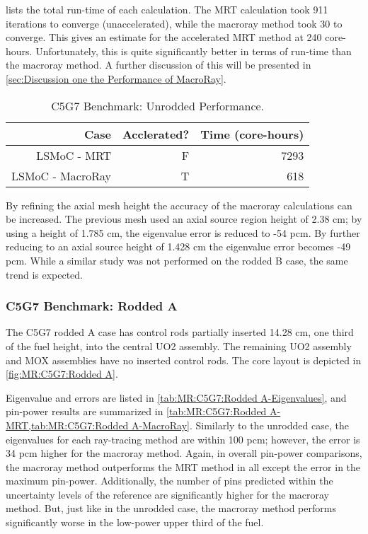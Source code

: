{{{{         lists the total run-time of each calculation.
        The \ac{MRT} calculation took 911 iterations to converge (unaccelerated), while the macroray method took 30 to converge.
        This gives an estimate for the accelerated \ac{MRT} method at 240 core-hours.
        Unfortunately, this is quite significantly better in terms of run-time than the macroray method.
        A further discussion of this will be presented in \cref{sec:Discussion one the Performance of MacroRay}.

        \begin{table}[htbp]
          \centering
          \caption{C5G7 Benchmark: Unrodded Performance. \label{tab:MR:C5G7:Unrodded-Performance}}
          \begin{tabular}{rrr}\toprule
            Case                        & Acclerated? & Time (core-hours)\\\midrule
            LSMoC - MRT                 & F & 7293\\
            LSMoC - MacroRay            & T & 618\\\bottomrule
          \end{tabular}
        \end{table}


        By refining the axial mesh height the accuracy of the macroray calculations can be increased.
        The previous mesh used an axial source region height of 2.38 cm; by using a height of 1.785 cm, the eigenvalue error is reduced to -54 pcm.
        By further reducing to an axial source height of 1.428 cm the eigenvalue error becomes -49 pcm.
        While a similar study was not performed on the rodded B case, the same trend is expected.
      }

      \subsubsection{C5G7 Benchmark: Rodded A}{\label{sssec:MR:C5G7:Rodded A}
        The C5G7 rodded A case has control rods partially inserted 14.28 cm, one third of the fuel height, into the central \ac{UO2} assembly.
        The remaining \ac{UO2} assembly and \ac{MOX} assemblies have no inserted control rods.
        The core layout is depicted in \cref{fig:MR:C5G7:Rodded A}.

        Eigenvalue and errors are listed in \cref{tab:MR:C5G7:Rodded A-Eigenvalues}, and pin-power results are summarized in \cref{tab:MR:C5G7:Rodded A-MRT,tab:MR:C5G7:Rodded A-MacroRay}.
        Similarly to the unrodded case, the eigenvalues for each ray-tracing method are within 100 pcm; however, the error is 34 pcm higher for the macroray method.
        Again, in overall pin-power comparisons, the macroray method outperforms the MRT method in all except the error in the maximum pin-power.
        Additionally, the number of pins predicted within the uncertainty levels of the reference are significantly higher for the macroray method.
        But, just like in the unrodded case, the macroray method performs significantly worse in the low-power upper third of the fuel.

}}}}
